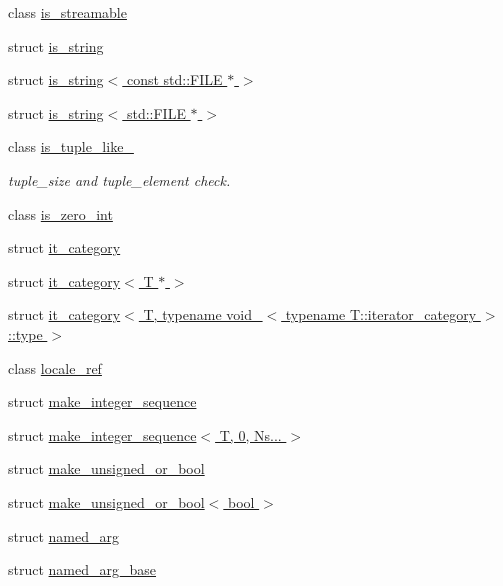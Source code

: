 \begin{DoxyCompactItemize}
\item 
class \hyperlink{classinternal_1_1is__streamable}{is\+\_\+streamable}
\item 
struct \hyperlink{structinternal_1_1is__string}{is\+\_\+string}
\item 
struct \hyperlink{structinternal_1_1is__string_3_01const_01std_1_1_f_i_l_e_01_5_01_4}{is\+\_\+string$<$ const std\+::\+F\+I\+L\+E $\ast$ $>$}
\item 
struct \hyperlink{structinternal_1_1is__string_3_01std_1_1_f_i_l_e_01_5_01_4}{is\+\_\+string$<$ std\+::\+F\+I\+L\+E $\ast$ $>$}
\item 
class \hyperlink{classinternal_1_1is__tuple__like__}{is\+\_\+tuple\+\_\+like\+\_\+}
\begin{DoxyCompactList}\small\item\em tuple\+\_\+size and tuple\+\_\+element check. \end{DoxyCompactList}\item 
class \hyperlink{classinternal_1_1is__zero__int}{is\+\_\+zero\+\_\+int}
\item 
struct \hyperlink{structinternal_1_1it__category}{it\+\_\+category}
\item 
struct \hyperlink{structinternal_1_1it__category_3_01_t_01_5_01_4}{it\+\_\+category$<$ T $\ast$ $>$}
\item 
struct \hyperlink{structinternal_1_1it__category_3_01_t_00_01typename_01void___3_01typename_01_t_1_1iterator__category_01_4_1_1type_01_4}{it\+\_\+category$<$ T, typename void\+\_\+$<$ typename T\+::iterator\+\_\+category $>$\+::type $>$}
\item 
class \hyperlink{classinternal_1_1locale__ref}{locale\+\_\+ref}
\item 
struct \hyperlink{structinternal_1_1make__integer__sequence}{make\+\_\+integer\+\_\+sequence}
\item 
struct \hyperlink{structinternal_1_1make__integer__sequence_3_01_t_00_010_00_01_ns_8_8_8_01_4}{make\+\_\+integer\+\_\+sequence$<$ T, 0, Ns... $>$}
\item 
struct \hyperlink{structinternal_1_1make__unsigned__or__bool}{make\+\_\+unsigned\+\_\+or\+\_\+bool}
\item 
struct \hyperlink{structinternal_1_1make__unsigned__or__bool_3_01bool_01_4}{make\+\_\+unsigned\+\_\+or\+\_\+bool$<$ bool $>$}
\item 
struct \hyperlink{structinternal_1_1named__arg}{named\+\_\+arg}
\item 
struct \hyperlink{structinternal_1_1named__arg__base}{named\+\_\+arg\+\_\+base}

\end{DoxyCompactItemize}
